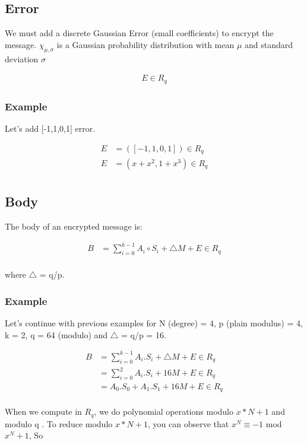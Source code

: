 \documentclass{techrep}
\theoremstyle{definition}
\theoremstyle{plain}
\begin{document}
	\subsection{Error}
We must add a discrete Gaussian Error (small coefficients) to encrypt the message.
$\chi_{\mu,\sigma}$ is a Gaussian probability distribution with mean $\mu$ and standard deviation $\sigma$

	\begin{align*}
		E \in R_q
	\end{align*}

\subsubsection{Example}

Let's add [-1,1,0,1] error.

\begin{align*} 
    E &= ([-1,1,0,1]) \in R_q \\ 
    E &= (x + x^2,1+x^3) \in R_q \\ 
\end{align*}

	\subsection{Body}
The body of an encrypted message is:

	\begin{align*}
		B &= \sum_{i=0}^{k-1}A_i \circ S_i + \bigtriangleup M + E \in R_q  \\
	\end{align*}

where $\bigtriangleup$ = q/p.

\subsubsection{Example}
Let’s continue with previous examples for N (degree) = 4, p (plain modulus) = 4, k = 2, q = 64 (modulo) and $\bigtriangleup$ = q/p = 16.

	\begin{align*}
		B &= \sum_{i=0}^{k-1}A_i . S_i + \bigtriangleup M + E \in R_q  \\
             &= \sum_{i=0}^2A_i . S_i + 16M + E \in R_q  \\
             &= A_0.S_0 + A_1.S_1 + 16M + E \in R_q  \\
	\end{align*}


When we compute in $R_q$, we do polynomial operations modulo $x*N + 1$ and modulo q
. To reduce modulo $x*N + 1$, you can observe that $x^N \equiv -1$ mod $x^N + 1$, So
\end{document}
